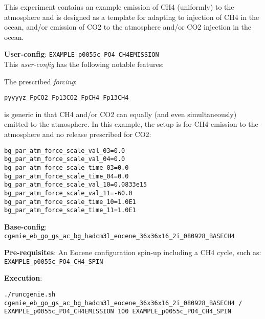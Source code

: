 \documentclass[10pt,twoside]{article}
\begin{document}
This experiment contains an example emission of CH4 (uniformly) to the atmosphere and is designed as a template for adapting to injection of CH4 in the ocean, and/or emission of CO2 to the atmosphere and/or CO2 injection in the ocean.

\noindent \textbf{User-config}: \texttt{EXAMPLE\_p0055c\_PO4\_CH4EMISSION}
\\ This \textit{user-config} has the following notable features:
\begin{compactitem}
	\item The prescribed \textit{forcing}:
\vspace{-5pt}\begin{verbatim}pyyyyz_FpCO2_Fp13CO2_FpCH4_Fp13CH4\end{verbatim}\vspace{-5pt}
	is generic in that CH4 and/or CO2 can equally (and even simultaneously) emitted to the atmosphere. In this example, the setup is for CH4 emission to the atmosphere and no release prescribed for CO2:
	\begin{verbatim}
bg_par_atm_force_scale_val_03=0.0
bg_par_atm_force_scale_val_04=0.0
bg_par_atm_force_scale_time_03=0.0
bg_par_atm_force_scale_time_04=0.0
bg_par_atm_force_scale_val_10=0.0833e15
bg_par_atm_force_scale_val_11=-60.0
bg_par_atm_force_scale_time_10=1.0E1
bg_par_atm_force_scale_time_11=1.0E1
		\end{verbatim}
\end{compactitem}

\noindent \textbf{Base-config}: \texttt{cgenie\_eb\_go\_gs\_ac\_bg\_hadcm3l\_eocene\_36x36x16\_2i\_080928\_BASECH4}

\noindent \textbf{Pre-requisites}: An Eocene configuration spin-up including a CH4 cycle, such as: \\ \texttt{EXAMPLE\_p0055c\_PO4\_CH4\_SPIN}

\noindent \textbf{Execution}:
\vspace{-5pt}\begin{verbatim}
./runcgenie.sh cgenie_eb_go_gs_ac_bg_hadcm3l_eocene_36x36x16_2i_080928_BASECH4 / 
EXAMPLE_p0055c_PO4_CH4EMISSION 100 EXAMPLE_p0055c_PO4_CH4_SPIN
		\end{verbatim}
\end{document}
